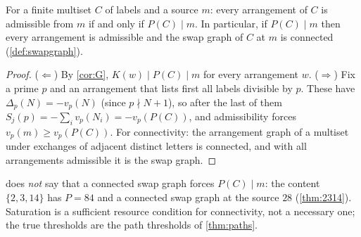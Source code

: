 \begin{proposition}\label{prop:sat}
For a finite multiset $C$ of labels and a source $m$: every arrangement of $C$ is admissible from $m$ if and only if $P(C)\mid m$. In particular, if $P(C)\mid m$ then every arrangement is admissible and the swap graph of $C$ at $m$ is connected (\cref{def:swapgraph}).
\end{proposition}
\begin{proof}
($\Leftarrow$) By \cref{cor:G}, $K(w)\mid P(C)\mid m$ for every arrangement $w$. ($\Rightarrow$) Fix a prime $p$ and an arrangement that lists first all labels divisible by $p$. These have $\Delta_p(N)=-v_p(N)$ (since $p\nmid N+1$), so after the last of them $S_j(p)=-\sum_iv_p(N_i)=-v_p(P(C))$, and admissibility forces $v_p(m)\ge v_p(P(C))$. For connectivity: the arrangement graph of a multiset under exchanges of adjacent distinct letters is connected, and with all arrangements admissible it is the swap graph.
\end{proof}
\begin{remark}\label{rem:converse}
 does \emph{not} say that a connected swap graph forces $P(C)\mid m$: the content $\{2,3,14\}$ has $P=84$ and a connected swap graph at the source $28$ (\cref{thm:2314}). Saturation is a sufficient resource condition for connectivity, not a necessary one; the true thresholds are the path thresholds of \cref{thm:paths}.
\end{remark}

